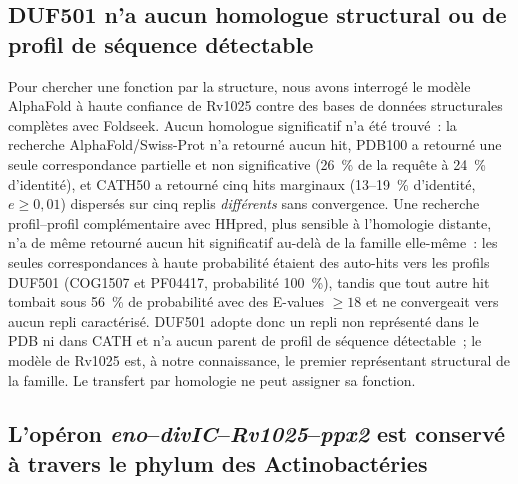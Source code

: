 \documentclass[11pt,a4paper]{article}
\begin{document}
\subsection{DUF501 n'a aucun homologue structural ou de profil de séquence détectable}

Pour chercher une fonction par la structure, nous avons interrogé le modèle AlphaFold à haute confiance de Rv1025 contre des bases de données structurales complètes avec Foldseek. Aucun homologue significatif n'a été trouvé~: la recherche AlphaFold/Swiss-Prot n'a retourné aucun hit, PDB100 a retourné une seule correspondance partielle et non significative (26~\% de la requête à 24~\% d'identité), et CATH50 a retourné cinq hits marginaux (13--19~\% d'identité, $e \geq 0,01$) dispersés sur cinq replis \emph{différents} sans convergence. Une recherche profil--profil complémentaire avec HHpred, plus sensible à l'homologie distante, n'a de même retourné aucun hit significatif au-delà de la famille elle-même~: les seules correspondances à haute probabilité étaient des auto-hits vers les profils DUF501 (COG1507 et PF04417, probabilité 100~\%), tandis que tout autre hit tombait sous 56~\% de probabilité avec des E-values $\geq 18$ et ne convergeait vers aucun repli caractérisé. DUF501 adopte donc un repli non représenté dans le PDB ni dans CATH et n'a aucun parent de profil de séquence détectable~; le modèle de Rv1025 est, à notre connaissance, le premier représentant structural de la famille. Le transfert par homologie ne peut assigner sa fonction.

\subsection{L'opéron \textit{eno}--\textit{divIC}--\textit{Rv1025}--\textit{ppx2} est conservé à travers le phylum des Actinobactéries}
\end{document}
